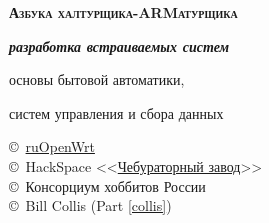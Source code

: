\begin{titlepage}
\vspace{1.5cm}

\begin{centering}

{\Huge \textbf{\textsc{Азбука халтурщика-ARMатурщика \bigskip}}}

{\Huge \textbf{\textit{разработка встраиваемых систем}}}

{\Large 
основы бытовой автоматики,

систем управления и сбора данных
}

\end{centering}

\vspace{1cm}

{\large
\noindent
\copyright\
\href{https://groups.google.com/forum/\#!forum/openwrt2ru}{ruOpenWrt}
 \\
\copyright\
HackSpace
<<\href{https://github.com/ponyatov/CHBZ/raw/master/presentation.pdf}{Чебураторный
завод}>> \\
\copyright\
Консорциум хоббитов России \\
\copyright\ Bill Collis (Part \ref{collis})
}
\end{titlepage}
